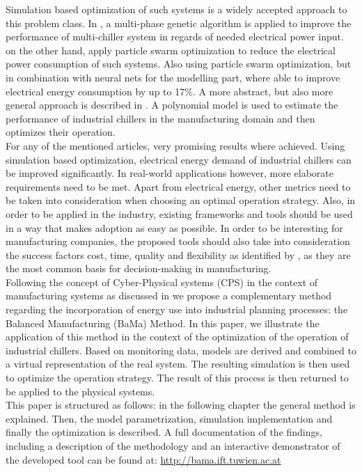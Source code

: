 \documentclass[3p,times,procedia,twocolumn,twoside]{elsarticle}
\begin{document}
Simulation based optimization of such systems is a widely accepted approach to this problem class. In \cite{Beghi2011}, a multi-phase genetic algorithm is applied to improve the performance of multi-chiller system in regards of needed electrical power input. \cite{Askarzadeh2015} on the other hand, apply particle swarm optimization to reduce the electrical power consumption of such systems. Also using particle swarm optimization, but in combination with neural nets for the modelling part, \cite{Chen2014} where able to improve electrical energy consumption by up to 17\%. A more abstract, but also more general approach is described in \cite{Munoz2017}. A polynomial model is used to estimate the performance of industrial chillers in the manufacturing domain and then optimizes their operation.\\
For any of the mentioned articles, very promising results where achieved. Using simulation based optimization, electrical energy demand of industrial chillers can be improved significantly. In real-world applications however, more elaborate requirements need to be met. Apart from electrical energy, other metrics need to be taken into consideration when choosing an optimal operation strategy. Also, in order to be applied in the industry, existing frameworks and tools should be used in a way that makes adoption as easy as possible. In order to be interesting for manufacturing companies, the proposed tools should also take into consideration the success factors cost, time, quality and flexibility as identified by \cite{Chryssolouris1992}, as they are the most common basis for decision-making in manufacturing.\\
Following the concept of Cyber-Physical systems (CPS) in the context of manufacturing systems as discussed in \cite{Jazdi2014,Monostori2014} we propose a complementary method regarding the incorporation of energy use into industrial planning processes: the Balanced Manufacturing (BaMa) Method. In this paper, we illustrate the application of this method in the context of the optimization of the operation of industrial chillers. Based on monitoring data, models are derived and combined to a virtual representation of the real system. The resulting simulation is then used to optimize the operation strategy. The result of this process is then returned to be applied to the physical systems.\\
This paper is structured as follows: in the following chapter the general method is explained. Then, the model parametrization, simulation implementation and finally the optimization is described. A full documentation of the findings, including a description of the methodology and an interactive demonstrator of the developed tool can be found at: \url{http://bama.ift.tuwien.ac.at}
\end{document}
